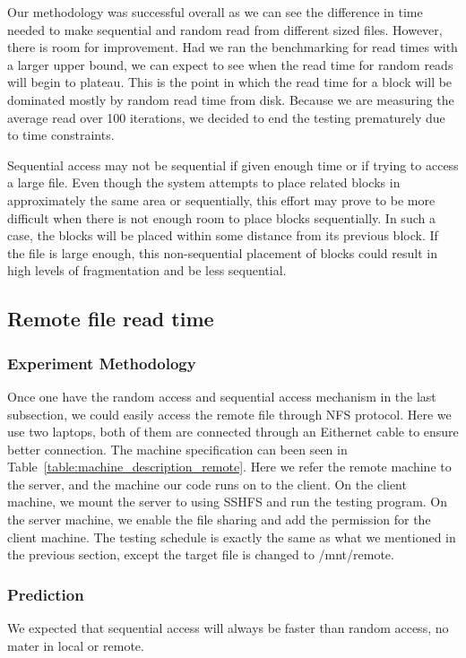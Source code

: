 \documentclass{article} %
\begin{document}
Our methodology was successful overall as we can see the difference in time needed to make sequential and random read from different sized files. However, there is room for improvement. Had we ran the benchmarking for read times with a larger upper bound, we can expect to see when the read time for random reads will begin to plateau. This is the point in which the read time for a block will be dominated mostly by random read time from disk. Because we are measuring the average read over 100 iterations, we decided to end the testing prematurely due to time constraints.

Sequential access may not be sequential if given enough time or if trying to access a large file. Even though the system attempts to place related blocks in approximately the same area or sequentially, this effort may prove to be more difficult when there is not enough room to place blocks sequentially. In such a case, the blocks will be placed within some distance from its previous block. If the file is large enough, this non-sequential placement of blocks could result in high levels of fragmentation and be less sequential.

\subsection{Remote file read time}

\subsubsection{Experiment Methodology}
Once one have the random access and sequential access mechanism in the last subsection, we could
easily access the remote file through NFS protocol. Here we use two laptops, both of them are connected through an Eithernet cable to ensure better connection. The machine specification can been seen in Table~\ref{table:machine_description_remote}. Here we refer the remote machine to the server, and the machine our code runs on to the client.
On the client machine, we mount the server to using SSHFS and run the testing program.
On the server machine,  we enable the file sharing and add the permission for the client machine.
The testing schedule is exactly the same as what we mentioned in the previous section, except the target file is changed to /mnt/remote.

\subsubsection{Prediction}
We expected that sequential access will always be faster than random access, no mater in local or remote.
\end{document}

